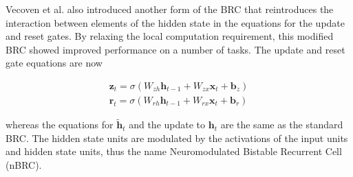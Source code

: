 Vecoven et al. \cite{vecoven2021brc} also introduced another form of the BRC that reintroduces the interaction between elements of the hidden state in the equations for the update and reset gates. By relaxing the local computation requirement, this modified BRC showed improved performance on a number of tasks. The update and reset gate equations are now

\begin{gather*}
	\mathbf{z}_t = \sigma(W_{zh} \mathbf{h}_{t-1} + W_{zx} \mathbf{x}_t + \mathbf{b}_z)\\
	\mathbf{r}_t = \sigma(W_{rh} \mathbf{h}_{t-1} + W_{rx} \mathbf{x}_t + \mathbf{b}_r)
\end{gather*}

whereas the equations for \(\mathbf{\tilde{h}}_t\) and the update to \(\mathbf{h}_t\) are the same as the standard BRC. The hidden state units are modulated by the activations of the input units and hidden state units, thus the name Neuromodulated Bistable Recurrent Cell (nBRC).